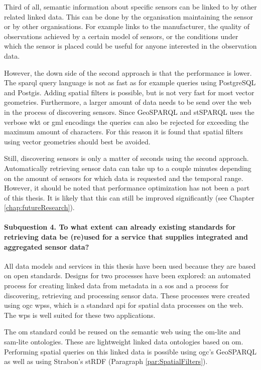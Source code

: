 Third of all, semantic information about specific sensors can be linked to by other related linked data. This can be done by the organisation maintaining the sensor or by other organisations. For example links to the manufacturer, the quality of observations achieved by a certain model of sensors, or the conditions under which the sensor is placed could be useful for anyone interested in the observation data. 

However, the down side of the second approach is that the performance is lower. The \ac{sparql} query language is not as fast as for example queries using PostgreSQL and Postgis. Adding spatial filters is possible, but is not very fast for most vector geometries. Furthermore, a larger amount of data needs to be send over the web in the process of discovering sensors. Since GeoSPARQL and stSPARQL uses the verbose \ac{wkt} or \ac{gml} encodings the queries can also be rejected for exceeding the maximum amount of characters. For this reason it is found that spatial filters using vector geometries should best be avoided. 

Still, discovering sensors is only a matter of seconds using the second approach. Automatically retrieving sensor data can take up to a couple minutes depending on the amount of sensors for which data is requested and the temporal range. However, it should be noted that performance optimization has not been a part of this thesis. It is likely that this can still be improved significantly (see Chapter \ref{chap:futureResearch}).              


\paragraph{\textbf{Subquestion 4.} To what extent can already existing standards for retrieving data be (re)used for a service that supplies integrated and aggregated sensor data?}\mbox{}

All data models and services in this thesis have been used because they are based on open standards. Designs for two processes have been explored: an automated process for creating linked data from metadata in a \ac{sos} and a process for discovering, retrieving and processing sensor data. These processes were created using \ac{ogc} \aclp{wps}, which is a standard \ac{api} for spatial data processes on the web. The \ac{wps} is well suited for these two applications.

The \ac{om} standard could be reused on the semantic web using the om-lite and sam-lite ontologies. These are lightweight linked data ontologies based on \ac{om}. Performing spatial queries on this linked data is possible using \ac{ogc}'s GeoSPARQL as well as using Strabon's stRDF (Paragraph \ref{par:SpatialFilters}).


